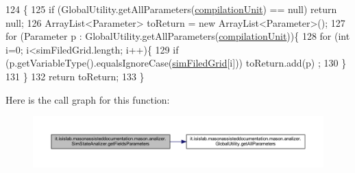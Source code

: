 \begin{DoxyCode}
124                                                      \{
125         \textcolor{keywordflow}{if} (GlobalUtility.getAllParameters(\hyperlink{classit_1_1isislab_1_1masonassisteddocumentation_1_1mason_1_1analizer_1_1_sim_state_analizer_a56f6f2a78ed4ed2aca4b727f945a32ed}{compilationUnit}) == null) \textcolor{keywordflow}{return} null;
126         ArrayList<Parameter> toReturn = \textcolor{keyword}{new} ArrayList<Parameter>();
127         \textcolor{keywordflow}{for} (Parameter p : GlobalUtility.getAllParameters(\hyperlink{classit_1_1isislab_1_1masonassisteddocumentation_1_1mason_1_1analizer_1_1_sim_state_analizer_a56f6f2a78ed4ed2aca4b727f945a32ed}{compilationUnit}))\{
128                 \textcolor{keywordflow}{for} (\textcolor{keywordtype}{int} i=0; i<simFiledGrid.length; i++)\{
129                     \textcolor{keywordflow}{if} (p.getVariableType().equalsIgnoreCase(\hyperlink{classit_1_1isislab_1_1masonassisteddocumentation_1_1mason_1_1analizer_1_1_sim_state_analizer_af21adec0b3c44f8bfc09cd83d6eeb917}{simFiledGrid}[i]))  toReturn.add(p)
      ;
130                 \}               
131         \}
132         \textcolor{keywordflow}{return} toReturn;
133     \}   
\end{DoxyCode}


Here is the call graph for this function\-:\nopagebreak
\begin{figure}[H]
\begin{center}
\leavevmode
\includegraphics[width=350pt]{classit_1_1isislab_1_1masonassisteddocumentation_1_1mason_1_1analizer_1_1_sim_state_analizer_a7ae9354f9db7c1455dac04271d21fad0_cgraph}
\end{center}
\end{figure}


